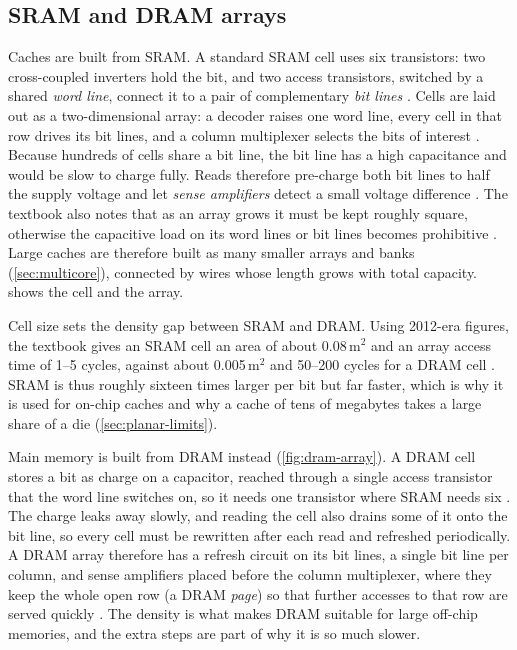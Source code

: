

\subsection{SRAM and DRAM arrays}
\label{sec:sram}
Caches are built from SRAM. A standard SRAM cell uses six transistors: two cross-coupled inverters hold the bit, and two access transistors, switched by a shared \emph{word line}, connect it to a pair of complementary \emph{bit lines} \cite[sec.~7.4.1]{sarangi2025basic}. Cells are laid out as a two-dimensional array: a decoder raises one word line, every cell in that row drives its bit lines, and a column multiplexer selects the bits of interest \cite[sec.~7.4.1]{sarangi2025basic}. Because hundreds of cells share a bit line, the bit line has a high capacitance and would be slow to charge fully. Reads therefore pre-charge both bit lines to half the supply voltage and let \emph{sense amplifiers} detect a small voltage difference \cite[sec.~7.4.1]{sarangi2025basic}. The textbook also notes that as an array grows it must be kept roughly square, otherwise the capacitive load on its word lines or bit lines becomes prohibitive \cite[sec.~7.4.1]{sarangi2025basic}. Large caches are therefore built as many smaller arrays and banks (\cref{sec:multicore}), connected by wires whose length grows with total capacity.  shows the cell and the array.




Cell size sets the density gap between SRAM and DRAM. Using 2012-era figures, the textbook gives an SRAM cell an area of about 0.08\,\textmu m$^2$ and an array access time of 1--5 cycles, against about 0.005\,\textmu m$^2$ and 50--200 cycles for a DRAM cell \cite[sec.~11.1.1, Table~11.1]{sarangi2025basic}. SRAM is thus roughly sixteen times larger per bit but far faster, which is why it is used for on-chip caches and why a cache of tens of megabytes takes a large share of a die (\cref{sec:planar-limits}).

Main memory is built from DRAM instead (\cref{fig:dram-array}). A DRAM cell stores a bit as charge on a capacitor, reached through a single access transistor that the word line switches on, so it needs one transistor where SRAM needs six \cite[sec.~7.4.3]{sarangi2025basic}. The charge leaks away slowly, and reading the cell also drains some of it onto the bit line, so every cell must be rewritten after each read and refreshed periodically. A DRAM array therefore has a refresh circuit on its bit lines, a single bit line per column, and sense amplifiers placed before the column multiplexer, where they keep the whole open row (a DRAM \emph{page}) so that further accesses to that row are served quickly \cite[sec.~7.4.3]{sarangi2025basic}. The density is what makes DRAM suitable for large off-chip memories, and the extra steps are part of why it is so much slower.

